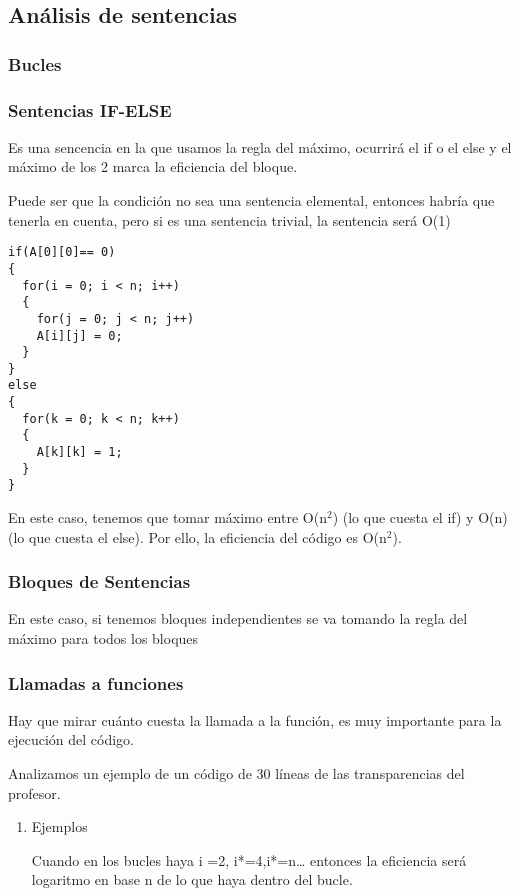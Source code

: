 \documentclass[11pt]{article}
\begin{document}
\subsection{Análisis de sentencias}
\label{sec-1-2}

\subsubsection{Bucles}
\label{sec-1-2-1}


\subsubsection{Sentencias IF-ELSE}
\label{sec-1-2-2}

Es una sencencia en la que usamos la regla del máximo, ocurrirá el if o el else y el máximo de los 2 marca la eficiencia del bloque.

Puede ser que la condición no sea una sentencia elemental, entonces habría que tenerla en cuenta, pero si es una sentencia trivial, la sentencia será O(1)


\begin{verbatim}
if(A[0][0]== 0)
{
  for(i = 0; i < n; i++)
  {
    for(j = 0; j < n; j++)
    A[i][j] = 0;
  }
}
else
{
  for(k = 0; k < n; k++)
  {
    A[k][k] = 1;
  }
}
\end{verbatim}


En este caso, tenemos que tomar máximo entre O(n$^{\text{2}}$) (lo que cuesta el if) y O(n)(lo que cuesta el else). Por ello, la eficiencia del código es O(n$^{\text{2}}$).

\subsubsection{Bloques de Sentencias}
\label{sec-1-2-3}
En este caso, si tenemos bloques independientes se va tomando la regla del máximo para todos los bloques

\subsubsection{Llamadas a funciones}
\label{sec-1-2-4}

Hay que mirar cuánto cuesta la llamada a la función, es muy importante para la ejecución del código.

Analizamos un ejemplo de un código de 30 líneas de las transparencias del profesor.


\begin{enumerate}
\item Ejemplos
\label{sec-1-2-4-1}

Cuando en los bucles haya i  =2, i*=4,i*=n\ldots{} entonces la eficiencia será logaritmo en base n de lo que haya dentro del bucle.
\end{enumerate}
\end{document}
